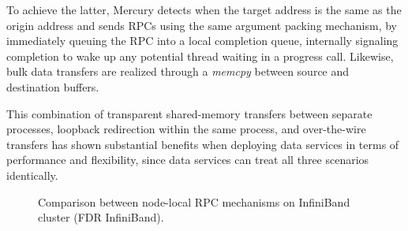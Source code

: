 \documentclass[11pt]{article}
\begin{document}
To achieve the latter, Mercury detects when the target address is the
same as the origin address and sends RPCs using the same argument packing mechanism,
by immediately queuing the RPC into a local completion queue, internally signaling
completion to wake up any potential thread waiting in a progress call. Likewise,
bulk data transfers are realized through a \textit{memcpy} between source and
destination buffers.

This combination of transparent shared-memory transfers between separate processes,
loopback redirection within the same process, and over-the-wire transfers has
shown substantial benefits when deploying data services in terms of performance
and flexibility, since data services can treat all three scenarios identically.


\begin{figure}[h]
\caption{Comparison between node-local RPC mechanisms on InfiniBand cluster (FDR InfiniBand).}
\label{fig:bench_sm}
\end{figure}

\end{document}
